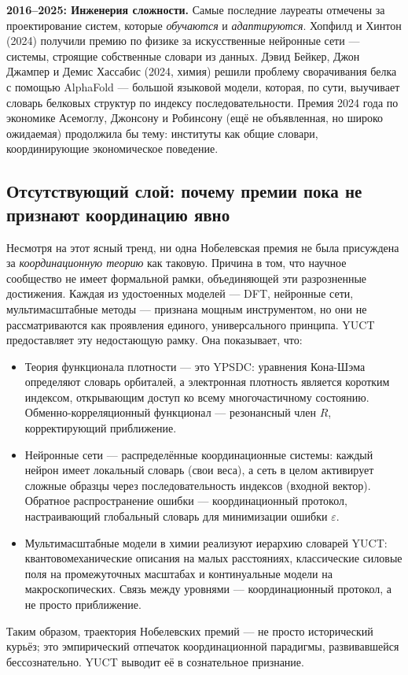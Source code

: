 \documentclass[12pt,a4paper]{article}
\begin{document}
	\textbf{2016–2025: Инженерия сложности.} Самые последние лауреаты отмечены за проектирование систем, которые \emph{обучаются} и \emph{адаптируются}. Хопфилд и Хинтон (2024) получили премию по физике за искусственные нейронные сети — системы, строящие собственные словари из данных. Дэвид Бейкер, Джон Джампер и Демис Хассабис (2024, химия) решили проблему сворачивания белка с помощью AlphaFold — большой языковой модели, которая, по сути, выучивает словарь белковых структур по индексу последовательности. Премия 2024 года по экономике Асемоглу, Джонсону и Робинсону (ещё не объявленная, но широко ожидаемая) продолжила бы тему: институты как общие словари, координирующие экономическое поведение.
	
	\subsection{Отсутствующий слой: почему премии пока не признают координацию явно}
	
	Несмотря на этот ясный тренд, ни одна Нобелевская премия не была присуждена за \emph{координационную теорию} как таковую. Причина в том, что научное сообщество не имеет формальной рамки, объединяющей эти разрозненные достижения. Каждая из удостоенных моделей — DFT, нейронные сети, мультимасштабные методы — признана мощным инструментом, но они не рассматриваются как проявления единого, универсального принципа. YUCT предоставляет эту недостающую рамку. Она показывает, что:
	\begin{itemize}
		\item Теория функционала плотности — это YPSDC: уравнения Кона-Шэма определяют словарь орбиталей, а электронная плотность является коротким индексом, открывающим доступ ко всему многочастичному состоянию. Обменно-корреляционный функционал — резонансный член \(R\), корректирующий приближение.
		\item Нейронные сети — распределённые координационные системы: каждый нейрон имеет локальный словарь (свои веса), а сеть в целом активирует сложные образцы через последовательность индексов (входной вектор). Обратное распространение ошибки — координационный протокол, настраивающий глобальный словарь для минимизации ошибки \(\varepsilon\).
		\item Мультимасштабные модели в химии реализуют иерархию словарей YUCT: квантовомеханические описания на малых расстояниях, классические силовые поля на промежуточных масштабах и континуальные модели на макроскопических. Связь между уровнями — координационный протокол, а не просто приближение.
	\end{itemize}
	Таким образом, траектория Нобелевских премий — не просто исторический курьёз; это эмпирический отпечаток координационной парадигмы, развивавшейся бессознательно. YUCT выводит её в сознательное признание.
	
\end{document}

